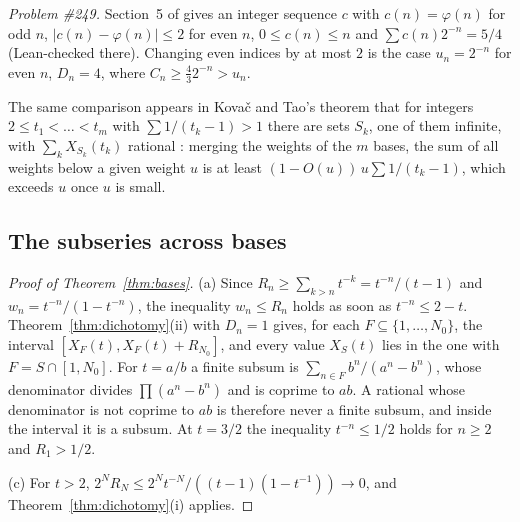 \documentclass[11pt]{article}
\begin{document}
\emph{Problem \#249.}  Section~5 of \cite{plectis249} gives an integer sequence
$c$ with $c(n)=\varphi(n)$ for odd $n$, $|c(n)-\varphi(n)|\le2$ for even $n$,
$0\le c(n)\le n$ and $\sum c(n)2^{-n}=5/4$ (Lean-checked there).  Changing even
indices by at most $2$ is the case $u_n=2^{-n}$ for even $n$, $D_n=4$, where
$C_n\ge\tfrac43 2^{-n}>u_n$.

The same comparison appears in Kova\v{c} and Tao's theorem that for integers
$2\le t_1<\dots<t_m$ with $\sum1/(t_k-1)>1$ there are sets $S_k$, one of them
infinite, with $\sum_kX_{S_k}(t_k)$ rational \cite[Theorem~2.3]{kovactao2024}:
merging the weights of the $m$ bases, the sum of all weights below a given
weight $u$ is at least $(1-O(u))\,u\sum1/(t_k-1)$, which exceeds $u$ once $u$
is small.

\subsection{The subseries across bases}\label{sec:bases}

\begin{proof}[Proof of Theorem~\ref{thm:bases}]
(a) Since $R_n\ge\sum_{k>n}t^{-k}=t^{-n}/(t-1)$ and
$w_n=t^{-n}/(1-t^{-n})$, the inequality $w_n\le R_n$ holds as soon as
$t^{-n}\le2-t$.  Theorem~\ref{thm:dichotomy}(ii) with $D_n=1$ gives, for
each $F\subseteq\{1,\dots,N_0\}$, the interval $[X_F(t),X_F(t)+R_{N_0}]$, and every
value $X_S(t)$ lies in the one with $F=S\cap[1,N_0]$.  For $t=a/b$ a finite subsum is
$\sum_{n\in F}b^n/(a^n-b^n)$, whose denominator divides $\prod(a^n-b^n)$ and is
coprime to $ab$.  A rational whose denominator is not coprime to $ab$ is
therefore never a finite subsum, and inside the interval it is a subsum.  At
$t=3/2$ the inequality $t^{-n}\le1/2$ holds for $n\ge2$ and $R_1>1/2$.

(c) For $t>2$, $2^NR_N\le2^Nt^{-N}/((t-1)(1-t^{-1}))\to0$, and
Theorem~\ref{thm:dichotomy}(i) applies.
\end{proof}
\end{document}
